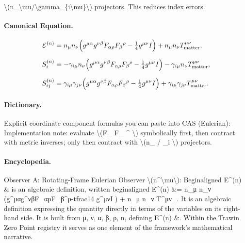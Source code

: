 \textbackslash{}(n\_\textbackslash{}mu/\textbackslash{}gamma\_\{i\textbackslash{}mu\}\textbackslash{}) projectors. This reduces index errors.

\paragraph{Canonical Equation.}
\[
\begin{aligned} \mathcal{E}^{(n)} &= n_\mu n_\nu\Big(g^{\mu\alpha}g^{\nu\beta}F_{\alpha\rho}F_{\beta}{}^{\rho}-\tfrac14 g^{\mu\nu}I\Big) + n_\mu n_\nu T^{\mu\nu}_{\rm matter},\\[6pt] S^{(n)}_i &= -\gamma_{i\mu}n_\nu\Big(g^{\mu\alpha}g^{\nu\beta}F_{\alpha\rho}F_{\beta}{}^{\rho}-\tfrac14 g^{\mu\nu}I\Big) - \gamma_{i\mu}n_\nu T^{\mu\nu}_{\rm matter},\\[6pt] S^{(n)}_{ij} &= \gamma_{i\mu}\gamma_{j\nu}\Big(g^{\mu\alpha}g^{\nu\beta}F_{\alpha\rho}F_{\beta}{}^{\rho}-\tfrac14 g^{\mu\nu}I\Big) + \gamma_{i\mu}\gamma_{j\nu}T^{\mu\nu}_{\rm matter}. \end{aligned}
\]

\paragraph{Dictionary.}
Explicit coordinate component formulas you can paste into CAS (Eulerian): Implementation note: evaluate \textbackslash{}(F\_ F\_ \textasciicircum{} \textbackslash{}) symbolically first, then contract with metric inverses; only then contract with \textbackslash{}(n\_ / \_i \textbackslash{}) projectors.

\paragraph{Encyclopedia.}
Observer A: Rotating-Frame Eulerian Observer \textbackslash{}(n\textasciicircum{}\textbackslash{}mu\textbackslash{}): Beginaligned E\textasciicircum{}(n) \& is an algebraic definition, written beginaligned E\textasciicircum{}(n) \&= n\_μ n\_ν (g\textasciicircum{}μαg\textasciicircum{}νβF\_αρF\_β\textasciicircum{}ρ-tfrac14 g\textasciicircum{}μνI ) + n\_μ n\_ν T\textasciicircum{}μν\_. It is an algebraic definition expressing the quantity directly in terms of the variables on its right-hand side. It is built from μ, ν, α, β, ρ, n, defining E\textasciicircum{}(n) \&. Within the Trawin Zero Point registry it serves as one element of the framework's mathematical narrative.
